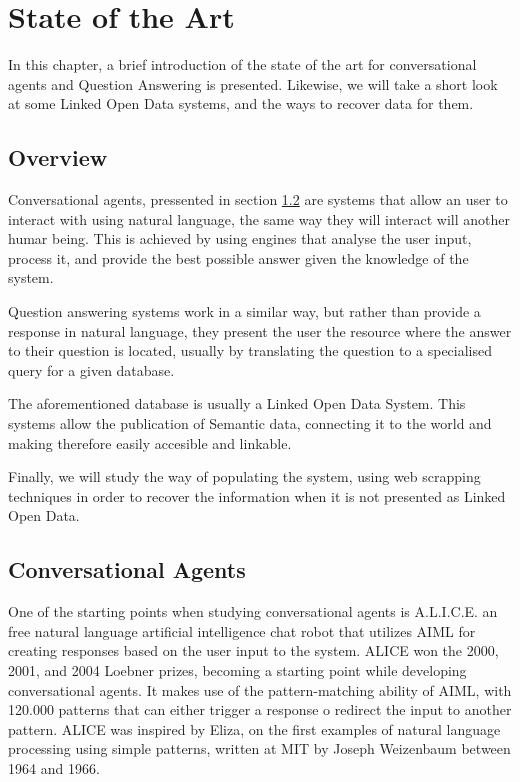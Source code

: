 \chapter{State of the Art}
\label{chap:state_of_the_art}

\begin{chapterintro}

In this chapter, a brief introduction of the state of the art for conversational agents and Question Answering is presented. Likewise, we will take a short look at some Linked Open Data systems, and the ways to recover data for them.


\end{chapterintro}

\cleardoublepage

\section{Overview}


Conversational agents, pressented in section \ref{sec:conv_agents} are systems that allow an user to interact with using natural language, the same way they will interact will another humar being. This is achieved by using engines that analyse the user input, process it, and provide the best possible answer given the knowledge of the system.

Question answering systems work in a similar way, but rather than provide a response in natural language, they present the user the resource where the answer to their question is located, usually by translating the question to a specialised query for a given database.

The aforementioned database is usually a Linked Open Data System. This systems allow the publication of Semantic data, connecting it to the world and making therefore easily accesible and linkable.

Finally, we will study the way of populating the system, using web scrapping techniques in order to recover the information when it is not presented as Linked Open Data.

\section{Conversational Agents}
\label{sec:conv_agents}

One of the starting points when studying conversational agents is A.L.I.C.E. an free natural language artificial intelligence chat robot that utilizes AIML for creating responses based on the user input to the system. ALICE won the 2000, 2001, and 2004 Loebner prizes, becoming a starting point while developing conversational agents. It makes use of the pattern-matching ability of AIML, with 120.000 patterns that can either trigger a response o redirect the input to another pattern. ALICE was inspired by Eliza, on the first examples of natural language processing using simple patterns, written at MIT by Joseph Weizenbaum between 1964 and 1966.


